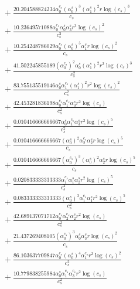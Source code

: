 \documentclass[10pt]{article}
\begin{document}
\begin{align*}
&{}  + \frac{20.204588824234 \alpha_{0}^{c_s} \left(\alpha_{0}^s\right)^{3} \left(\alpha_{1}^s\right)^{2} r \log{\left(c_{s} \right)}^{3}}{c_{s}} \\
&{}  + \frac{10.23649571088 \alpha_{0}^{c_s} \alpha_{0}^s \alpha_{3}^s r^{3} \log{\left(c_{s} \right)}^{2}}{c_{s}^{3}} \\
&{}  + \frac{10.254248786029 \alpha_{0}^{c_s} \left(\alpha_{0}^s\right)^{5} \alpha_{1}^s r \log{\left(c_{s} \right)}^{2}}{c_{s}} \\
&{}  + \frac{41.502245855189 \left(\alpha_{0}^{c_s}\right)^{2} \alpha_{0}^s \left(\alpha_{1}^s\right)^{2} r^{2} \log{\left(c_{s} \right)}^{3}}{c_{s}^{2}} \\
&{}  + \frac{83.755135519146 \alpha_{0}^s \alpha_{1}^{c_s} \left(\alpha_{1}^s\right)^{2} r^{2} \log{\left(c_{s} \right)}^{2}}{c_{s}^{2}} \\
&{}  + \frac{42.453281836198 \alpha_{0}^{c_s} \alpha_{1}^{c_s} \alpha_{3}^s r^{2} \log{\left(c_{s} \right)}}{c_{s}^{2}} \\
&{}  + \frac{0.010416666666667 \alpha_{0}^s \alpha_{1}^{c_s} \alpha_{3}^s r^{2} \log{\left(c_{s} \right)}^{5}}{c_{s}^{2}} \\
&{}  + \frac{0.010416666666667 \left(\alpha_{0}^s\right)^{2} \alpha_{2}^{c_s} \alpha_{2}^s r \log{\left(c_{s} \right)}^{5}}{c_{s}} \\
&{}  + \frac{0.010416666666667 \left(\alpha_{0}^{c_s}\right)^{3} \left(\alpha_{0}^s\right)^{2} \alpha_{2}^s r \log{\left(c_{s} \right)}^{5}}{c_{s}} \\
&{}  + \frac{0.020833333333333 \alpha_{1}^{c_s} \alpha_{1}^s \alpha_{2}^s r^{2} \log{\left(c_{s} \right)}^{5}}{c_{s}^{2}} \\
&{}  + \frac{0.083333333333333 \left(\alpha_{0}^s\right)^{3} \alpha_{1}^{c_s} \alpha_{1}^s r^{2} \log{\left(c_{s} \right)}^{5}}{c_{s}^{2}} \\
&{}  + \frac{42.689137071712 \alpha_{0}^{c_s} \alpha_{2}^{c_s} \alpha_{2}^s r^{2} \log{\left(c_{s} \right)}}{c_{s}^{2}} \\
&{}  + \frac{21.437269408105 \left(\alpha_{0}^{c_s}\right)^{3} \alpha_{0}^s \alpha_{3}^s r \log{\left(c_{s} \right)}^{2}}{c_{s}} \\
&{}  + \frac{86.103637709847 \alpha_{0}^{c_s} \left(\alpha_{0}^s\right)^{4} \alpha_{1}^{c_s} r^{2} \log{\left(c_{s} \right)}^{2}}{c_{s}^{2}} \\
&{}  + \frac{10.779838255984 \alpha_{0}^s \alpha_{1}^{c_s} \alpha_{3}^{c_s} r^{2} \log{\left(c_{s} \right)}}{c_{s}^{2}} \\

\end{align*}
\end{document}
